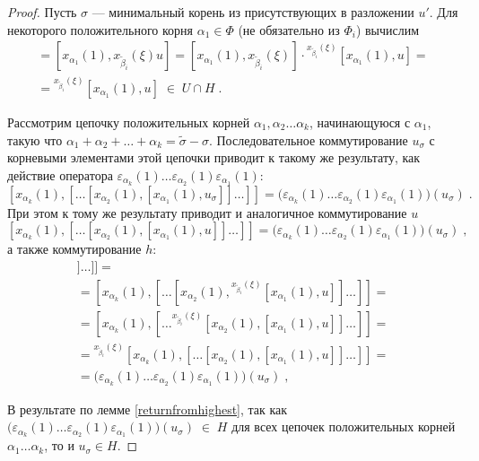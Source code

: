 \documentclass[10pt]{article}
\theoremstyle{remark}
\begin{document}
\begin{proof}
Пусть $\sigma$ --- минимальный корень из присутствующих в разложении $u'$. Для некоторого положительного корня $\alpha_1 \in \Phi$ (не обязательно из $\Phi_i$) вычислим
\begin{multline*}
[x_{\alpha_1}(1), h] = [x_{\alpha_1}(1), x_{\widetilde\beta_i}(\xi)u] =
[x_{\alpha_1}(1), x_{\widetilde\beta_i}(\xi)] \cdot {}^{x_{\widetilde\beta_i}(\xi)}[x_{\alpha_1}(1),u] =\\=
{}^{x_{\widetilde\beta_i}(\xi)}[x_{\alpha_1}(1),u] \; \in \; U \cap H \; .
\end{multline*}

Рассмотрим цепочку положительных корней $\alpha_1,\alpha_2 \ldots \alpha_k$, начинающуюся с $\alpha_1$, такую что $\alpha_1+\alpha_2+\ldots+\alpha_k=\widetilde\sigma-\sigma$. Последовательное коммутирование $u_\sigma$ с корневыми элементами этой цепочки приводит к такому же результату, как действие оператора $\varepsilon_{\alpha_k}(1)\ldots\varepsilon_{\alpha_2}(1)\varepsilon_{\alpha_1}(1)$:
$$ [x_{\alpha_k}(1),[\ldots[x_{\alpha_2}(1),[x_{\alpha_1}(1),u_\sigma]]\ldots]] =
\big(\varepsilon_{\alpha_k}(1)\ldots\varepsilon_{\alpha_2}(1)\varepsilon_{\alpha_1}(1)\big)(u_\sigma) \;.$$
При этом к тому же результату приводит и аналогичное коммутирование $u$
$$ [x_{\alpha_k}(1),[\ldots[x_{\alpha_2}(1),[x_{\alpha_1}(1),u]]\ldots]] =
\big(\varepsilon_{\alpha_k}(1)\ldots\varepsilon_{\alpha_2}(1)\varepsilon_{\alpha_1}(1)\big)(u_\sigma) \;,$$
а также коммутирование $h$:
\begin{multline*}
[x_{\alpha_k}(1),[\ldots[x_{\alpha_2}(1),[x_{\alpha_1}(1),h]]\ldots]] =\\=
[x_{\alpha_k}(1),[\ldots[x_{\alpha_2}(1),{}^{x_{\widetilde\beta_i}(\xi)}[x_{\alpha_1}(1),u]]\ldots]] =\\=
[x_{\alpha_k}(1),[\ldots{}^{x_{\widetilde\beta_i}(\xi)}[x_{\alpha_2}(1),[x_{\alpha_1}(1),u]]\ldots]] =\\=
{}^{x_{\widetilde\beta_i}(\xi)}[x_{\alpha_k}(1),[\ldots[x_{\alpha_2}(1),[x_{\alpha_1}(1),u]]\ldots]] =\\=
\big(\varepsilon_{\alpha_k}(1)\ldots\varepsilon_{\alpha_2}(1)\varepsilon_{\alpha_1}(1)\big)(u_\sigma) \;,
\end{multline*}

В результате по лемме \ref{returnfromhighest}, так как $\big(\varepsilon_{\alpha_k}(1)\ldots\varepsilon_{\alpha_2}(1)\varepsilon_{\alpha_1}(1)\big)(u_\sigma) \; \in \; H$ для всех цепочек положительных корней $\alpha_1\ldots\alpha_k$, то и $u_\sigma \in H$.


\end{proof}
\end{document}
